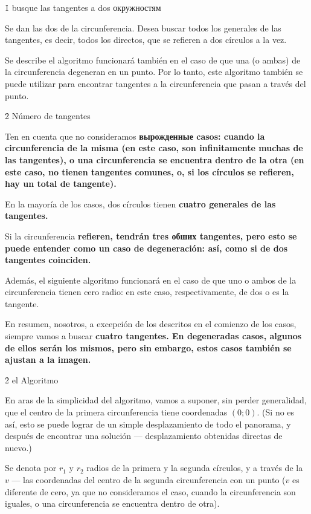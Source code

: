 \h1{ busque las tangentes a dos окружностям }

Se dan las dos de la circunferencia. Desea buscar todos los generales de las tangentes, es decir, todos los directos, que se refieren a dos círculos a la vez.

Se describe el algoritmo funcionará también en el caso de que una (o ambas) de la circunferencia degeneran en un punto. Por lo tanto, este algoritmo también se puede utilizar para encontrar tangentes a la circunferencia que pasan a través del punto.


\h2{ Número de tangentes }

Ten en cuenta que no consideramos \bf{вырожденные} casos: cuando la circunferencia de la misma (en este caso, son infinitamente muchas de las tangentes), o una circunferencia se encuentra dentro de la otra (en este caso, no tienen tangentes comunes, o, si los círculos se refieren, hay un total de tangente).

En la mayoría de los casos, dos círculos tienen \bf{cuatro} generales de las tangentes.

Si la circunferencia \bf{refieren}, tendrán tres обших tangentes, pero esto se puede entender como un caso de degeneración: así, como si de dos tangentes coinciden.

Además, el siguiente algoritmo funcionará en el caso de que uno o ambos de la circunferencia tienen cero radio: en este caso, respectivamente, de dos o es la tangente.

En resumen, nosotros, a excepción de los descritos en el comienzo de los casos, siempre vamos a buscar \bf{cuatro tangentes}. En degeneradas casos, algunos de ellos serán los mismos, pero sin embargo, estos casos también se ajustan a la imagen.


\h2{ el Algoritmo }

En aras de la simplicidad del algoritmo, vamos a suponer, sin perder generalidad, que el centro de la primera circunferencia tiene coordenadas $(0;0)$. (Si no es así, esto se puede lograr de un simple desplazamiento de todo el panorama, y después de encontrar una solución --- desplazamiento obtenidas directas de nuevo.)

Se denota por $r_1$ y $r_2$ radios de la primera y la segunda círculos, y a través de la $v$ --- las coordenadas del centro de la segunda circunferencia con un punto ($v$ es diferente de cero, ya que no consideramos el caso, cuando la circunferencia son iguales, o una circunferencia se encuentra dentro de otra).

